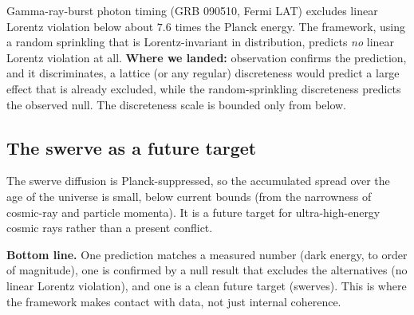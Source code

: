 Gamma-ray-burst photon timing (GRB 090510, Fermi LAT) excludes linear Lorentz violation
below about $7.6$ times the Planck energy. The framework, using a random sprinkling that
is Lorentz-invariant in distribution, predicts \emph{no} linear Lorentz violation at
all. \textbf{Where we landed:} observation confirms the prediction, and it discriminates,
a lattice (or any regular) discreteness would predict a large effect that is already
excluded, while the random-sprinkling discreteness predicts the observed null. The
discreteness scale is bounded only from below.

\subsection{The swerve as a future target}

The swerve diffusion is Planck-suppressed, so the accumulated spread over the age of the
universe is small, below current bounds (from the narrowness of cosmic-ray and particle
momenta). It is a future target for ultra-high-energy cosmic rays rather than a present
conflict.

\textbf{Bottom line.} One prediction matches a measured number (dark energy, to order of
magnitude), one is confirmed by a null result that excludes the alternatives (no linear
Lorentz violation), and one is a clean future target (swerves). This is where the
framework makes contact with data, not just internal coherence.
